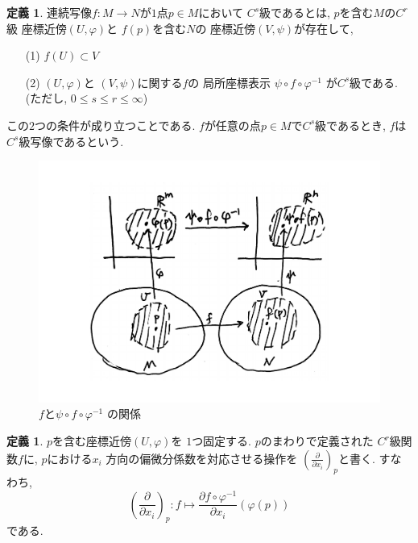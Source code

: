\documentclass[twocolumn]{jarticle}
\theoremstyle{definition}
\newtheorem{definition}[theorem]{定義}
\begin{document}
\begin{definition}\label{def:C^s map}
  連続写像$f:M\to N$が$1$点$p\in M$において
  $C^s$級であるとは, $p$を含む$M$の$C^r$級
  座標近傍$(U,\varphi)$と
  $f(p)$を含む$N$の
  座標近傍$(V,\psi)$が存在して, 
  \begin{itemize}
      \item[(1)]$f(U)\subset V$
      \item[(2)]$(U,\varphi)$と
      $(V,\psi)$に関する$f$の
      局所座標表示
      $\psi\circ f\circ \varphi^{-1}$
      が$C^s$級である.
      (ただし, $0\leq s \leq r \leq \infty$) 
  \end{itemize}
  この$2$つの条件が成り立つことである. 
  $f$が任意の点$p\in M$で$C^s$級であるとき, 
  $f$は$C^s$級写像であるという. 
\end{definition}
\begin{figure}[H]
  \centering
  \includegraphics[keepaspectratio, scale=0.24]
       {Csmap.pdf}
  \caption{$f$と$\psi\circ f\circ \varphi^{-1}$
  の関係}
  \label{Csmap}
 \end{figure}
\begin{definition}
  $p$を含む座標近傍$(U,\varphi)$を
  $1$つ固定する. $p$のまわりで定義された
  $C^r$級関数$f$に, $p$における$x_i$
  方向の偏微分係数を対応させる操作を
  $\left(\frac{\partial}{\partial x_i}
  \right)_p$と書く. すなわち, 
  $$\left(\frac{\partial}{\partial x_i}
  \right)_p:f\mapsto 
  \frac{\partial f\circ \varphi^{-1}}{\partial x_i}(
    \varphi(p))$$
  である. 
\end{definition}
\end{document}

